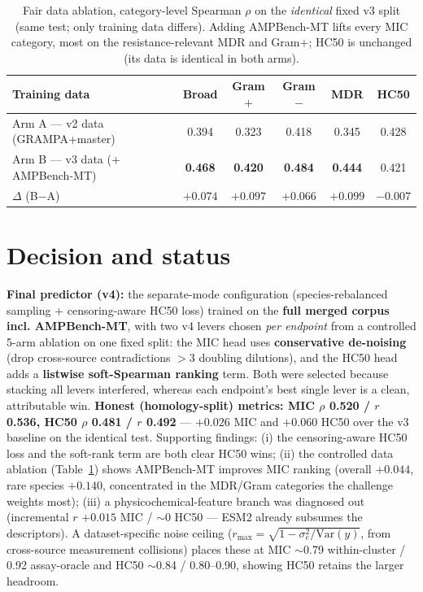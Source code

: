 \documentclass[11pt]{article}
\begin{document}
\begin{table}[h]\centering\small
\caption{Fair data ablation, category-level Spearman $\rho$ on the \emph{identical} fixed v3 split
(same test; only training data differs). Adding AMPBench-MT lifts every MIC category, most on the
resistance-relevant MDR and Gram$+$; HC50 is unchanged (its data is identical in both arms).}
\label{tab:ablation}
\begin{tabular}{@{}lccccc@{}}
\toprule
\textbf{Training data} & \textbf{Broad} & \textbf{Gram$+$} & \textbf{Gram$-$} & \textbf{MDR} & \textbf{HC50} \\
\midrule
Arm A --- v2 data (GRAMPA+master) & 0.394 & 0.323 & 0.418 & 0.345 & 0.428 \\
Arm B --- v3 data ($+$AMPBench-MT) & \textbf{0.468} & \textbf{0.420} & \textbf{0.484} & \textbf{0.444} & 0.421 \\
$\Delta$ (B$-$A) & $+0.074$ & $+0.097$ & $+0.066$ & $+0.099$ & $-0.007$ \\
\bottomrule
\end{tabular}
\end{table}

\section{Decision and status}

\textbf{Final predictor (v4):} the separate-mode configuration (species-rebalanced sampling +
censoring-aware HC50 loss) trained on the \textbf{full merged corpus incl. AMPBench-MT}, with two v4
levers chosen \emph{per endpoint} from a controlled 5-arm ablation on one fixed split: the MIC head
uses \textbf{conservative de-noising} (drop cross-source contradictions $>3$ doubling dilutions), and
the HC50 head adds a \textbf{listwise soft-Spearman ranking} term. Both were selected because
stacking all levers interfered, whereas each endpoint's best single lever is a clean, attributable
win. \textbf{Honest (homology-split) metrics: MIC $\rho$ 0.520 / $r$ 0.536, HC50 $\rho$ 0.481 /
$r$ 0.492} --- $+0.026$ MIC and $+0.060$ HC50 over the v3 baseline on the identical test. Supporting
findings: (i) the censoring-aware HC50 loss and the soft-rank term are both clear HC50 wins; (ii) the
controlled data ablation (Table~\ref{tab:ablation}) shows AMPBench-MT improves MIC ranking (overall
$+0.044$, rare species $+0.140$, concentrated in the MDR/Gram categories the challenge weights most);
(iii) a physicochemical-feature branch was diagnosed out (incremental $r$ $+0.015$ MIC / $\sim\!0$
HC50 --- ESM2 already subsumes the descriptors). A dataset-specific noise ceiling
($r_{\max}=\sqrt{1-\sigma_e^2/\mathrm{Var}(y)}$, from cross-source measurement collisions) places
these at MIC $\sim$0.79 within-cluster / 0.92 assay-oracle and HC50 $\sim$0.84 / 0.80--0.90, showing
HC50 retains the larger headroom.
\end{document}
